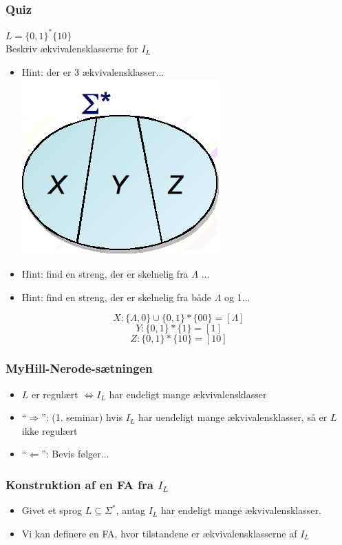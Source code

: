 \documentclass[]{beamer}
\begin{document}
\begin{frame}
\frametitle{Quiz}
$L = \{0,1\}^*\{10\}$ \\
Beskriv ækvivalensklasserne for $I_L$
\begin{itemize}[<+->]
\item Hint:  der er 3 ækvivalensklasser...
\includegraphics[scale=0.4]{images/2_seminar_equivclassessigma}
\item Hint:  find en streng, der er skelnelig fra $\Lambda$ ...
\item Hint:  find en streng, der er skelnelig 
  fra både $\Lambda$ og 1...
\end{itemize}
\pause
\[X:  \{\Lambda , 0\} \cup \{0,1\}*\{00\} = [\Lambda ]\]
\[Y:  \{0,1\}*\{1\} = [1]\]
\[Z:  \{0,1\}*\{10\} = [10]\]
\end{frame}

\begin{frame}
\frametitle{MyHill-Nerode-sætningen}
\begin{itemize}[<+->]
\item $L$ er regulært $\Leftrightarrow I_L$ har endeligt mange 				      ækvivalensklasser
\item “$\Rightarrow$”: (1. seminar) hvis $I_L$ har uendeligt mange 
	 ækvivalensklasser, så er $L$ ikke regulært
\item “$\Leftarrow$”: Bevis følger...
\end{itemize}
\end{frame}

\begin{frame}
\frametitle{Konstruktion af en FA fra $I_L$}
\begin{itemize}[<+->]
\item Givet et sprog $L\subseteq \Sigma^*$, antag $I_L$ har 
endeligt mange ækvivalensklasser.
\item
Vi kan definere en FA, hvor tilstandene er ækvivalensklasserne af $I_L$
\end{itemize}
\end{frame}
\end{document}
